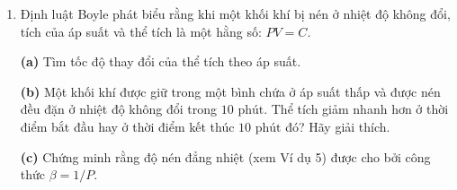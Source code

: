 \begin{minipage}[t]{0.48\textwidth}
\begin{enumerate}[label=\textbf{\arabic*.}, leftmargin=1.8em, itemsep=7pt, parsep=0pt, topsep=0pt, start=21]
\item Định luật Boyle phát biểu rằng khi một khối khí bị nén ở nhiệt độ không đổi, tích của áp suất và thể tích là một hằng số: $PV = C$.
\par\vspace{3pt}
\textbf{(a)} Tìm tốc độ thay đổi của thể tích theo áp suất.
\par\vspace{3pt}
\textbf{(b)} Một khối khí được giữ trong một bình chứa ở áp suất thấp và được nén đều đặn ở nhiệt độ không đổi trong $10\text{ phút}$. Thể tích giảm nhanh hơn ở thời điểm bắt đầu hay ở thời điểm kết thúc $10\text{ phút}$ đó? Hãy giải thích.
\par\vspace{3pt}
\textbf{(c)} Chứng minh rằng độ nén đẳng nhiệt (xem Ví dụ 5) được cho bởi công thức $\beta = 1/P$.

\end{enumerate}
\end{minipage}
